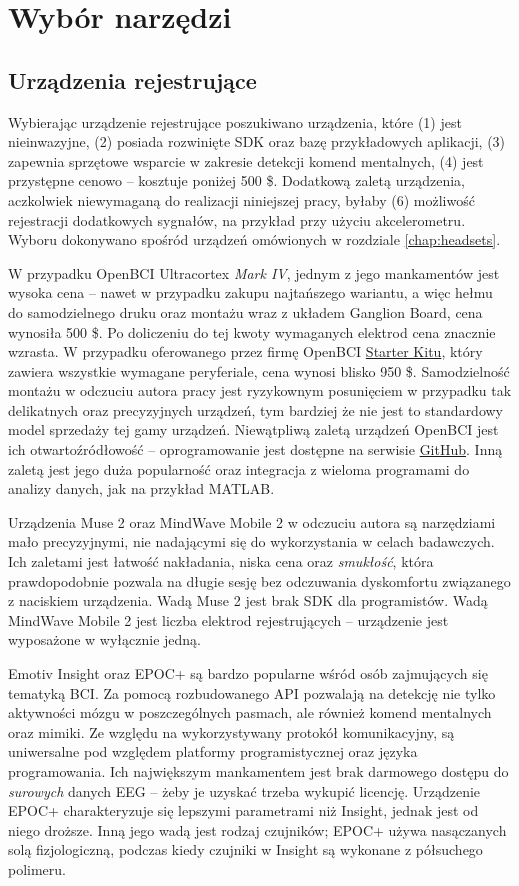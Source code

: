 \documentclass[skorowidz,skroty]{dyplomWEZUT}
\begin{document}
\section{Wybór narzędzi}
\subsection{Urządzenia rejestrujące}
Wybierając urządzenie rejestrujące poszukiwano urządzenia, które (1) jest nieinwazyjne, (2) posiada rozwinięte SDK oraz bazę przykładowych aplikacji, (3) zapewnia sprzętowe wsparcie w zakresie detekcji komend mentalnych, (4) jest przystępne cenowo -- kosztuje poniżej 500 \$. Dodatkową zaletą urządzenia, aczkolwiek niewymaganą do realizacji niniejszej pracy, byłaby (6) możliwość rejestracji dodatkowych sygnałów, na przykład przy użyciu akcelerometru. Wyboru dokonywano spośród urządzeń omówionych w rozdziale \vref{chap:headsets}.

W przypadku OpenBCI Ultracortex \textit{Mark IV}, jednym z jego mankamentów jest wysoka cena -- nawet w przypadku zakupu najtańszego wariantu, a więc hełmu do samodzielnego druku oraz montażu wraz z układem Ganglion Board, cena wynosiła 500 \$. Po doliczeniu do tej kwoty wymaganych elektrod cena znacznie wzrasta. W przypadku oferowanego przez firmę OpenBCI \href{https://shop.openbci.com/collections/frontpage/products/d-i-y-neurotechnologists-starter-kit}{Starter Kitu}, który zawiera wszystkie wymagane peryferiale, cena wynosi blisko 950 \$. Samodzielność montażu w odczuciu autora pracy jest ryzykownym posunięciem w przypadku tak delikatnych oraz precyzyjnych urządzeń, tym bardziej że nie jest to standardowy model sprzedaży tej gamy urządzeń. Niewątpliwą zaletą urządzeń OpenBCI jest ich otwartoźródłowość -- oprogramowanie jest dostępne na serwisie \href{https://github.com/OpenBC}{GitHub}. Inną zaletą jest jego duża popularność oraz integracja z wieloma programami do analizy danych, jak na przykład MATLAB.

Urządzenia Muse 2 oraz MindWave Mobile 2 w odczuciu autora są narzędziami mało precyzyjnymi, nie nadającymi się do wykorzystania w celach badawczych. Ich zaletami jest łatwość nakładania, niska cena oraz \textit{smukłość}, która prawdopodobnie pozwala na długie sesję bez odczuwania dyskomfortu związanego z naciskiem urządzenia. Wadą Muse 2 jest brak SDK dla programistów. Wadą MindWave Mobile 2 jest liczba elektrod rejestrujących -- urządzenie jest wyposażone w wyłącznie jedną.

Emotiv Insight oraz EPOC+ są bardzo popularne wśród osób zajmujących się tematyką BCI. Za pomocą rozbudowanego API pozwalają na detekcję nie tylko aktywności mózgu w poszczególnych pasmach, ale również komend mentalnych oraz mimiki. Ze względu na wykorzystywany protokół komunikacyjny, są uniwersalne pod względem platformy programistycznej oraz języka programowania. Ich największym mankamentem jest brak darmowego dostępu do \textit{surowych} danych EEG -- żeby je uzyskać trzeba wykupić licencję. Urządzenie EPOC+ charakteryzuje się lepszymi parametrami niż Insight, jednak jest od niego droższe. Inną jego wadą jest rodzaj czujników; EPOC+ używa nasączanych solą fizjologiczną, podczas kiedy czujniki w Insight są wykonane z półsuchego polimeru.
\end{document}
